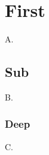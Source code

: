 \documentclass{article}
\begin{document}
\section{First}
A.
\subsection{Sub}
B.
\subsubsection{Deep}
C.
\end{document}
